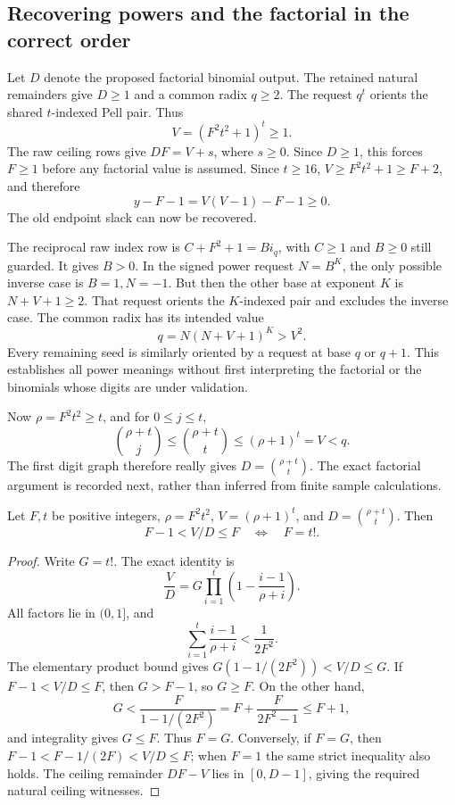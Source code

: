 \subsection{Recovering powers and the factorial in the correct order}
Let $D$ denote the proposed factorial binomial output. The retained natural
remainders give $D\ge1$ and a common radix $q\ge2$. The request $q^t$
orients the shared $t$-indexed Pell pair. Thus
\[
 V=(F^2t^2+1)^t\ge1.
\]
The raw ceiling rows give $DF=V+s$, where $s\ge0$. Since $D\ge1$,
this forces $F\ge1$ before any factorial value is assumed. Since $t\ge16$,
$V\ge F^2t^2+1\ge F+2$, and therefore
\[
 y-F-1=V(V-1)-F-1\ge0.
\]
The old endpoint slack can now be recovered.

The reciprocal raw index row is $C+F^2+1=B i_q$, with $C\ge1$ and
$B\ge0$ still guarded. It gives $B>0$. In the signed power request
$N=B^K$, the only possible inverse case is $B=1,N=-1$. But then the
other base at exponent $K$ is $N+V+1\ge2$. That request orients the
$K$-indexed pair and excludes the inverse case. The common radix has its
intended value
\[
 q=N(N+V+1)^K>V^2.
\]
Every remaining seed is similarly oriented by a request at base $q$ or
$q+1$. This establishes all power meanings without first interpreting the
factorial or the binomials whose digits are under validation.

Now $\rho=F^2t^2\ge t$, and for $0\le j\le t$,
\[
 \binom{\rho+t}{j}\le\binom{\rho+t}{t}
 \le(\rho+1)^t=V<q.
\]
The first digit graph therefore really gives $D=\binom{\rho+t}{t}$.
The exact factorial argument is recorded next, rather than inferred from
finite sample calculations.

\begin{lemma}
Let $F,t$ be positive integers, $\rho=F^2t^2$,
$V=(\rho+1)^t$, and $D=\binom{\rho+t}{t}$. Then
\[
 F-1<V/D\le F\quad\Longleftrightarrow\quad F=t!.
\]
\end{lemma}
\begin{proof}
Write $G=t!$. The exact identity is
\[
 \frac VD=G\prod_{i=1}^t
   \left(1-\frac{i-1}{\rho+i}\right).
\]
All factors lie in $(0,1]$, and
\[
 \sum_{i=1}^t\frac{i-1}{\rho+i}
 <\frac{1}{2F^2}.
\]
The elementary product bound gives
$G(1-1/(2F^2))<V/D\le G$.
If $F-1<V/D\le F$, then $G>F-1$, so $G\ge F$.
On the other hand,
\[
 G<\frac{F}{1-1/(2F^2)}
   =F+\frac{F}{2F^2-1}\le F+1,
\]
and integrality gives $G\le F$. Thus $F=G$.
Conversely, if $F=G$, then
$F-1<F-1/(2F)<V/D\le F$; when $F=1$ the same strict inequality
also holds. The ceiling remainder $DF-V$ lies in $[0,D-1]$, giving
the required natural ceiling witnesses.
\end{proof}

